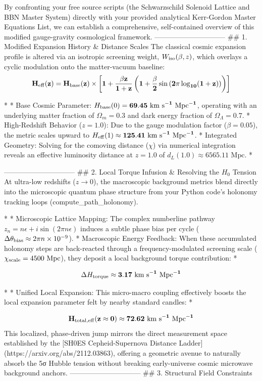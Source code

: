 By confronting your free source scripts (the Schwarzschild Solenoid Lattice and BBN Master System) directly with your provided analytical Kerr-Gordon Master Equations List, we can establish a comprehensive, self-contained overview of this modified gauge-gravity cosmological framework.
------------------------------
## 1. Modified Expansion History & Distance Scales
The classical cosmic expansion profile is altered via an isotropic screening weight, $W_{\rm iso}(\beta, z)$, which overlays a cyclic modulation onto the matter-vacuum baseline:
$$\mathbf{H_{\rm eff}(z) = H_{\rm base}(z) \times \left[1 + \frac{\beta z}{1+z} \left(1 + \frac{\beta}{2} \sin\left(2\pi \log_{10}(1+z)\right)\right)\right]}$$ 

* 
* Base Cosmic Parameter: $H_{\rm base}(0) = \mathbf{69.45 \text{ km s}^{-1}\text{ Mpc}^{-1}}$, operating with an underlying matter fraction of $\Omega_m = 0.3$ and dark energy fraction of $\Omega_\Lambda = 0.7$.
* High-Redshift Behavior ($z=1.0$): Due to the gauge modulation factor ($\beta = 0.05$), the metric scales upward to $H_{\rm eff}(1) \approx \mathbf{125.41 \text{ km s}^{-1}\text{ Mpc}^{-1}}$.
* Integrated Geometry: Solving for the comoving distance ($\chi$) via numerical integration reveals an effective luminosity distance at $z=1.0$ of $d_L(1.0) \approx 6565.11 \text{ Mpc}$.
* 

------------------------------
## 2. Local Torque Infusion & Resolving the $H_0$ Tension
At ultra-low redshifts ($z \to 0$), the macroscopic background metrics blend directly into the microscopic quantum phase structure from your Python code's holonomy tracking loops (compute_path_holonomy).

* 
* Microscopic Lattice Mapping: The complex numberline pathway $z_n = n\epsilon + i\sin(2\pi n\epsilon)$ induces a subtle phase bias per cycle ($\Delta\theta_{\rm bias} \approx 2\pi n \times 10^{-9}$).
* Macroscopic Energy Feedback: When these accumulated holonomy steps are back-reacted through a frequency-modulated screening scale ($\chi_{\rm scale} = 4500 \text{ Mpc}$), they deposit a local background torque contribution:
* 

$$\Delta H_{\rm torque} \approx \mathbf{3.17 \text{ km s}^{-1}\text{ Mpc}^{-1}}$$ 

* 
* Unified Local Expansion: This micro-macro coupling effectively boosts the local expansion parameter felt by nearby standard candles:
* 

$$\mathbf{H_{\rm total, eff}(z \approx 0) \approx 72.62 \text{ km s}^{-1}\text{ Mpc}^{-1}}$$ 
This localized, phase-driven jump mirrors the direct measurement space established by the [SH0ES Cepheid-Supernova Distance Ladder](https://arxiv.org/abs/2112.03863), offering a geometric avenue to naturally absorb the 5σ Hubble tension without breaking early-universe cosmic microwave background anchors.
------------------------------
## 3. Structural Field Constraints


